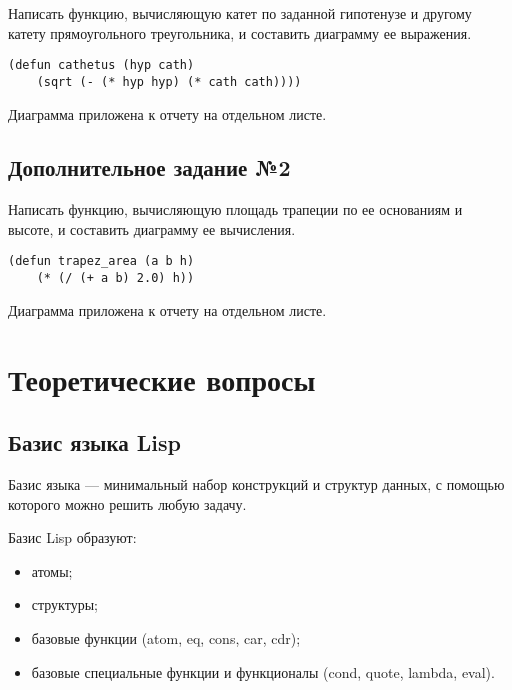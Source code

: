 Написать функцию, вычисляющую катет по заданной гипотенузе и другому
катету прямоугольного треугольника, и составить диаграмму ее выражения.

\vspace{4mm}
\begin{minipage}{0.92\linewidth}
\begin{lstlisting}
(defun cathetus (hyp cath)
    (sqrt (- (* hyp hyp) (* cath cath))))
\end{lstlisting}
\end{minipage}

Диаграмма приложена к отчету на отдельном листе.

\section{Дополнительное задание №2}

Написать функцию, вычисляющую площадь трапеции по ее основаниям и
высоте, и составить диаграмму ее вычисления.

\vspace{4mm}
\begin{minipage}{0.92\linewidth}
\begin{lstlisting}
(defun trapez_area (a b h)
    (* (/ (+ a b) 2.0) h))
\end{lstlisting}
\end{minipage}

Диаграмма приложена к отчету на отдельном листе.


\chapter{Теоретические вопросы}

\section{Базис языка Lisp}

Базис языка --- минимальный набор конструкций и структур данных, с помощью
которого можно решить любую задачу.

Базис Lisp образуют:
\begin{itemize}
    \item атомы;
    \item структуры;
    \item базовые функции (atom, eq, cons, car, cdr);
    \item базовые специальные функции и  функционалы (cond, quote, lambda, eval).
\end{itemize}

